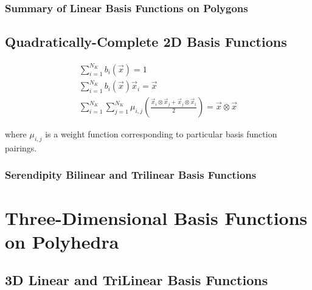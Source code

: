 \subsubsection{Summary of Linear Basis Functions on Polygons}
\label{sec::BF_2D_Linear_Summary}

\subsection{Quadratically-Complete 2D Basis Functions}
\label{sec::BF_2D_Quadratic}

\begin{gather}
	 \sum_{i=1}^{N_K} b_i (\vec{x})  =  1 \\
	\sum_{i=1}^{N_K} b_i(\vec{x}) \vec{x}_i  =  \vec{x} \\
	\sum_{i=1}^{N_K} \sum_{j=1}^{N_K} \mu _{i,j}  \left(   \frac{\vec{x}_i \otimes \vec{x}_j +\vec{x}_j \otimes \vec{x}_i }{2}  \right)  = \vec{x} \otimes \vec{x}
\label{eq::quadratic_interp_requirements}
\end{gather}

\noindent where $\mu_{i,j}$ is a weight function corresponding to particular basis function pairings.

\subsubsection{Serendipity Bilinear and Trilinear Basis Functions}
\label{sec::BF_Quadratic_BiLTriL}

\section{Three-Dimensional Basis Functions on Polyhedra}
\label{sec::BF_3D}



\subsection{3D Linear and TriLinear Basis Functions}
\label{sec::BF_3D_TriL}

